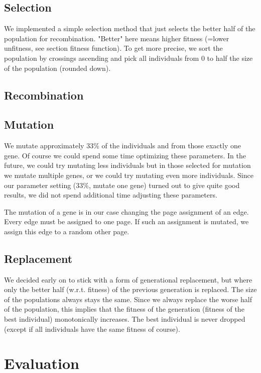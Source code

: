 \documentclass [11pt]{article}
\begin{document}
\subsection{Selection}

We implemented a simple selection method that just selects the better half of the population for recombination. "Better" here means higher fitness (=lower unfitness, see section fitness function). To get more precise, we sort the population by crossings ascending and pick all individuals from 0 to half the size of the population (rounded down).

\subsection{Recombination}



\subsection{Mutation}

We mutate approximately 33\% of the individuals and from those exactly one gene. Of course we could spend some time optimizing these parameters. In the future, we could try mutating less individuals but in those selected for mutation we mutate multiple genes, or we could try mutating even more individuals. Since our parameter setting (33\%, mutate one gene) turned out to give quite good results, we did not spend additional time adjusting these parameters.

The mutation of a gene is in our case changing the page assignment of an edge. Every edge must be assigned to one page. If such an assignment is mutated, we assign this edge to a random other page.

\subsection{Replacement}
We decided early on to stick with a form of generational replacement, but where only the better  half  (w.r.t. fitness) of the previous generation is replaced. The size of the populations always stays the same. Since we always replace the worse half of the population, this implies that the fitness of the generation (fitness of the best individual) monotonically increases. The best individual is never dropped (except if all individuals have the same fitness of course).

\section{Evaluation}
\end{document}

